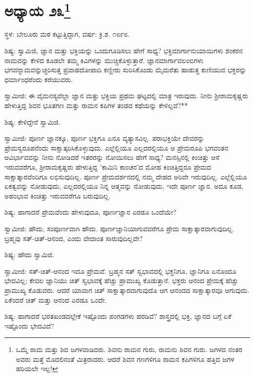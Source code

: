 \newpage

\chapter[ಅಧ್ಯಾಯ ೨೩]{ಅಧ್ಯಾಯ ೨೩\protect\footnote{ಒಮ್ಮೆ ರಾಮ ಮತ್ತು ಶಿವ ಜಗಳವಾಡಿದರು. ಶಿವನು ರಾಮನ ಗುರು, ರಾಮನು ಶಿವನ ಗುರು. ಜಗಳದ ನಂತರ ಅವರು ಮತ್ತೆ ಮೊದಲಿನಂತೆ ಮಿತ್ರರಾದರು. ಆದರೆ ಶಿವನ ಗಣಗಳಿಗೂ ರಾಮನ ಕಪಿಗಳಿಗೂ ಹತ್ತಿದ ಜಗಳ ಹರಿಯಲೇ ಇಲ್ಲ!}}

\begin{center}
ಸ್ಥಳ: ಬೇಲೂರು ಮಠ ಕಟ್ಟುತ್ತಿದ್ದಾಗ, ವರ್ಷ: ಕ್ರಿ.ಶ. ೧೮೯೮.
\end{center}

ಶಿಷ್ಯ: ಸ್ವಾಮಿಜಿ, ಜ್ಞಾನ ಮತ್ತು ಭಕ್ತಿಯನ್ನು ಒಂದುಗೂಡಿಸಲು ಹೇಗೆ ಸಾಧ್ಯ? ಭಕ್ತಿಮಾರ್ಗಾನುಯಾಯಿಗಳು ಶಂಕರನ ನಾಮವನ್ನು ಕೇಳಿದ ಕೂಡಲೇ ತಮ್ಮ ಕಿವಿಗಳನ್ನು ಮುಚ್ಚಿಕೊಳ್ಳುತ್ತಾರೆ. ಜ್ಞಾನಮಾರ್ಗಾವಲಂಬಿಗಳು ಭಗವನ್ನಾಮವನ್ನುಚ್ಚರಿಸುತ್ತ ಪ್ರವಾಹದೋಪಾದಿ ಕಣ್ಣೀರು ಸುರಿಸಿಕೊಂಡು ಮೈಮರೆತು ಹಾಡುತ್ತ ಕುಣಿಯುವ ಭಕ್ತರನ್ನು ಧರ್ಮಾಂಧರೆಂದು ಕರೆಯುವರು.

ಸ್ವಾಮೀಜಿ: ಈ ವೈಮನಸ್ಯವೆಲ್ಲಾ ಜ್ಞಾನ ಮತ್ತು ಭಕ್ತಿಯ ಪ್ರಥಮ ಘಟ್ಟದಲ್ಲಿ ಮಾತ್ರ ಇರುವುದು. ನೀನು ಶ‍್ರೀರಾಮಕೃಷ್ಣರು ಹೇಳುತ್ತಿದ್ದ ಶಿವನ ಭೂತಗಣ ಮತ್ತು ರಾಮನ ಕಪಿಗಳ ತಂಡದ ಕಥೆಯನ್ನು ಕೇಳಿಲ್ಲವೆ?**

ಶಿಷ್ಯ: ಕೇಳಿದ್ದೇನೆ ಸ್ವಾಮಿಜಿ.

ಸ್ವಾಮೀಜಿ: ಪೂರ್ಣ ಜ್ಞಾನಕ್ಕೂ, ಪೂರ್ಣ ಭಕ್ತಿಗೂ ಏನೂ ವ್ಯತ್ಯಾಸವಿಲ್ಲ. ಪರಾಭಕ್ತಿಯೇ ದೇವರನ್ನು ಪ್ರೇಮಸ್ವರೂಪನೆಂದು ಸಾಕ್ಷಾತ್ಕರಿಸಿಕೊಳ್ಳುವುದು. ಎಲ್ಲೆಲ್ಲಿಯೂ ಎಲ್ಲದರಲ್ಲಿಯೂ ಆ ಪ್ರೇಮರೂಪಿ ಭಗವಂತನ ಆವಿರ್ಭಾವವನ್ನು ನೀನು ನೋಡಿದರೆ ಇತರರನ್ನು ನೋಯಿಸಲು ಹೇಗೆ ಸಾಧ್ಯ? ಮನಸ್ಸಿನಲ್ಲಿ ಕಿಂಚಿತ್ತು ಆಸೆ ಇರುವವರೆಗೂ, ಶ‍್ರೀರಾಮಕೃಷ್ಣರು ಹೇಳುತ್ತಿದ್ದ 'ಕಾಮಿನಿ ಕಾಂಚನ'ದ ಮೋಹ ಕಿಂಚಿತ್ತಿದ್ದರೂ ಪ್ರೇಮದ ಸಾಕ್ಷಾತ್ಕಾರವೆಂದಿಗೂ ಲಭಿಸುವುದಿಲ್ಲ. ಪೂರ್ಣ ಪ್ರೇಮದರ್ಶನದಲ್ಲಿ ನಮ್ಮ ದೇಹದ ಅರಿವೇ ಇರುವುದಿಲ್ಲ. ಎಲ್ಲೆಲ್ಲಿಯೂ ಏಕತ್ವವನ್ನು ನೋಡುವುದು, ಎಲ್ಲದರಲ್ಲಿಯೂ ನಿನ್ನ ಆತ್ಮವನ್ನು ನೋಡುವುದು, ಇದೇ ಪೂರ್ಣ ಜ್ಞಾನ. ಅದೂ ಕೂಡ, ಅಹಂಭಾವ ಕಿಂಚಿತ್ತು ಇರುವವರೆಗೂ ಬರುವುದಿಲ್ಲ.

ಶಿಷ್ಯ: ಹಾಗಾದರೆ ಪ್ರೇಮವೆಂದು ಹೇಳುವುದೂ, ಪೂರ್ಣಜ್ಞಾನ ಎರಡೂ ಒಂದೆಯೇ?

ಸ್ವಾಮೀಜಿ: ಹೌದು, ಸಂಪೂರ್ಣವಾಗಿ ಹೌದು. ಪೂರ್ಣಜ್ಞಾನಿಯಾಗುವವರೆಗೂ ಪ್ರೇಮ ಸಾಕ್ಷಾತ್ಕಾರವಾಗುವುದಿಲ್ಲ. ಬ್ರಹ್ಮವು ಸತ್-ಚಿತ್-ಆನಂದ, ಎಂದು ವೇದಾಂತ ಸಾರುವುದಿಲ್ಲವೇ?

ಶಿಷ್ಯ: ಹೌದು ಸ್ವಾಮಿಜಿ.

ಸ್ವಾಮೀಜಿ: ಸತ್-ಚಿತ್-ಆನಂದ ಇದೂ ಪ್ರೇಮವೆ. ಬ್ರಹ್ಮನ ಸತ್ ಸ್ವಭಾವದಲ್ಲಿ ಭಕ್ತನಿಗೂ, ಜ್ಞಾನಿಗೂ ಏನೊಂದೂ ಭೇದವಿಲ್ಲ; ಕೇವಲ ಜ್ಞಾನಿಯು ಚಿತ್ ಸ್ವಭಾವಕ್ಕೆ ಹೆಚ್ಚು ಪ್ರಾಮುಖ್ಯ ಕೊಡುತ್ತಾನೆ. ಭಕ್ತರು ಆನಂದ ಪ್ರೇಮಕ್ಕೆ ಹೆಚ್ಚು ಪ್ರಾಮುಖ್ಯ ಕೊಡುವರು. ಆದರೆ ಯಾವಾಗ ಚಿತ್ ಸಾಕ್ಷಾತ್ಕಾರವಾಗುವುದೊ ಆಗ ಆನಂದದ ಸಾಕ್ಷಾತ್ಕಾರವೂ ಆಗುವುದು. ಏಕೆಂದರೆ ಚಿತ್ ಮತ್ತು ಆನಂದ ಎರಡೂ ಒಂದೇ.

ಶಿಷ್ಯ: ಹಾಗಾದರೆ ಭರತಖಂಡದಲ್ಲೇಕೆ ಇಷ್ಟೊಂದು ಪಂಗಡಗಳು ಹರಡಿವೆ? ಶಾಸ್ತ್ರದಲ್ಲಿ ಭಕ್ತಿ, ಜ್ಞಾನದ ಬಗ್ಗೆ ಏಕೆ ಇಷ್ಟೊಂದು ಭೇದವಿದೆ?

